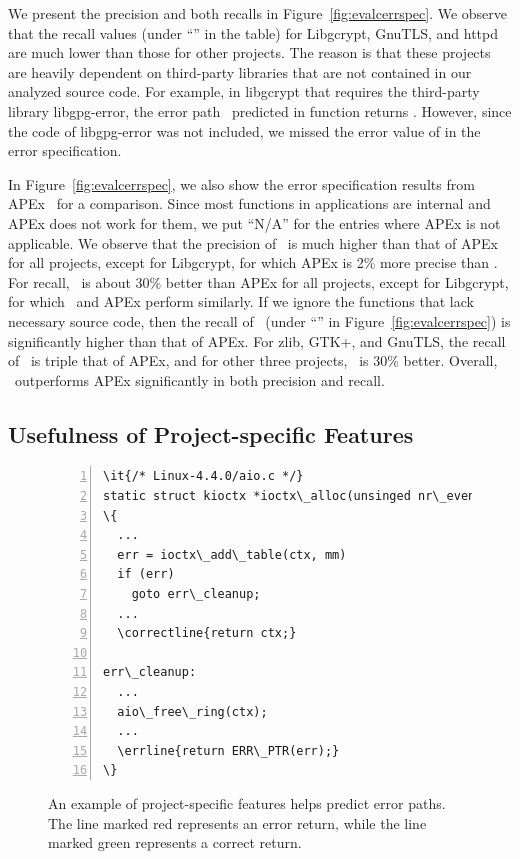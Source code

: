 \documentclass[12pt]{report}	%
\begin{document}
We present the precision and both recalls in Figure~\ref{fig:evalcerrspec}.
%
%
We observe that the recall values (under ``\newTool'' in the table) 
for Libgcrypt, GnuTLS, and httpd
are much lower than those for other projects.
The reason is that these projects are heavily dependent on third-party libraries
that are not contained in our analyzed source code.
For example,  in libgcrypt that requires the third-party library libgpg-error,
the error path \newTool\ predicted in function 
returns . 
However, since the code of libgpg-error was not included,
we missed the error value of 
in the error specification.

In Figure~\ref{fig:evalcerrspec}, we also 
show the error specification results from APEx~\cite{Kang:2016:AAI:2970276.2970354}
for a comparison. 
Since most functions in applications are internal and APEx does not work for them,
we put ``N/A'' for the entries where APEx is not applicable. 
%
We observe that the precision of \newTool\ is much higher than
that of APEx for all projects, except for Libgcrypt, for which 
APEx is 2\% more precise than \newTool. 
For recall, 
\newTool\ is about 30\% better than APEx for all projects, 
except for Libgcrypt, for which
\newTool\ and APEx perform similarly. 
If we ignore the functions that lack necessary source code, 
then the recall of \newTool\ 
(under ``\newTool*'' in Figure~\ref{fig:evalcerrspec}) is significantly
higher than that of APEx. For zlib, GTK+, and GnuTLS, the recall of
\newTool\ is triple that of APEx, and for other three projects, \newTool\
is 30\% better. 
%
Overall,
\newTool\ outperforms APEx significantly
in both precision and recall. 



\subsection{Usefulness of Project-specific Features}
\label{sec:app:eval:impact}

\begin{figure}
\centering
\begin{Verbatim}[numbers=left,xleftmargin=6mm,fontsize=\footnotesize,
    commandchars=\\\{\}]
\it{/* Linux-4.4.0/aio.c */}
static struct kioctx *ioctx\_alloc(unsinged nr\_events)
\{
  ...
  err = ioctx\_add\_table(ctx, mm)
  if (err)
    goto err\_cleanup;
  ...
  \correctline{return ctx;}

err\_cleanup:
  ...
  aio\_free\_ring(ctx);
  ...
  \errline{return ERR\_PTR(err);}
\}
\end{Verbatim}
\caption[An example of the usefulness of project-specific features]{An example of project-specific features helps predict error paths.
The line marked red represents an error return,
while the line marked green represents a correct return.}
\label{fig:psfeature-use}
\end{figure}
\end{document}
